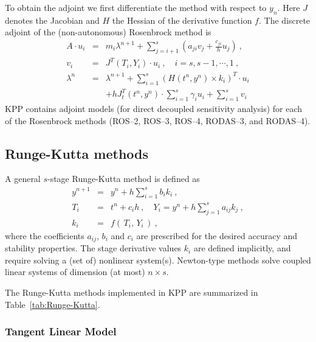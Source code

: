 \documentclass[twoside]{article}
\begin{document}
To obtain the adjoint we first differentiate the method with respect to
$y_n$. Here $J$ denotes the Jacobian and $H$ the Hessian of the
derivative function $f$. The discrete adjoint of the (non-autonomous)
Rosenbrock method is
%
\begin{eqnarray}
\label{Ros_disc_adj}
A \cdot u_i
&=& m_i \lambda^{n+1} + \sum_{j=i+1}^s \left( a_{ji} v_j + \frac{c_{ji}}{h}
u_j \right)~,\\
\nonumber
v_i &=& J^T(T_i,Y_i)\cdot u_i~, \quad i = s,s-1,\cdots,1~,\\
\nonumber
\lambda^n &=& \lambda^{n+1} + \sum_{i=1}^s \left( H(t^n,y^n) \times
k_i\right)^T
\cdot u_i\\
\nonumber
&& + h J^T_t(t^n,y^n) \cdot \sum_{i=1}^s \gamma_i u_i+  \sum_{i=1}^s v_i
\end{eqnarray}
%
KPP contains adjoint models (for direct decoupled sensitivity analysis)
for each of the Rosenbrock methods (ROS--2, ROS--3, ROS--4, RODAS--3,
and RODAS--4).

\subsection{Runge-Kutta methods}

A general $s$-stage Runge-Kutta method is defined as \cite[Section II.1]{k:HW1}
%
\begin{eqnarray}
\label{eqn:RungeKutta}
y^{n+1} &=& y^n + h \sum_{i=1}^s b_i k_i~,\\
\nonumber
T_i &=& t^n + c_i h~, \quad
Y_i = y^n + h \sum_{j=1}^{s} a_{ij} k_j~,\\
\nonumber
k_i &=& f\left( \, T_i, \, Y_i \,\right)~,
\end{eqnarray}
%
where the coefficients $a_{ij}$, $b_i$ and $c_i$ are prescribed for the
desired accuracy and stability properties. The stage derivative values
$k_i$ are defined implicitly, and require solving a (set of) nonlinear
system(s). Newton-type methods solve coupled linear systems of dimension
(at most) $n \times s$.

The Runge-Kutta methods implemented in KPP are summarized in
Table~\ref{tab:Runge-Kutta}.

\subsubsection{Tangent Linear Model}
\end{document}
